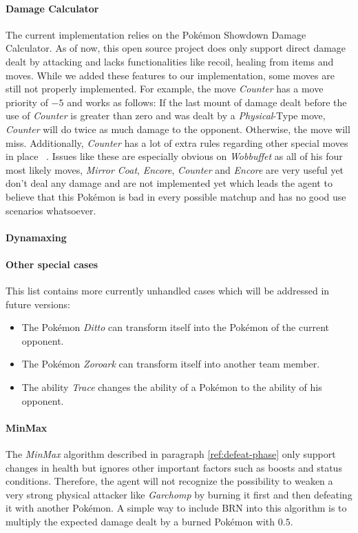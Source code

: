 \paragraph{Damage Calculator}
The current implementation relies on the Pokémon Showdown Damage Calculator. As of now, this open source project does 
only support direct damage dealt by attacking and lacks functionalities like recoil, healing from items and moves. While
we added these features to our implementation, some moves are still not properly implemented. For example, the move
\textit{Counter} has a move priority  of $-5$ and works as follows:
If the last mount of damage dealt before the use of \textit{Counter} is greater than zero and was dealt by a 
\textit{Physical}-Type move, \textit{Counter} will do twice as much damage to the opponent. Otherwise, the move
will miss. Additionally, \textit{Counter} has a lot of extra rules regarding other special moves in place 
~\autocite{Bulbapedia:Counter}. Issues like these are especially obvious on \textit{Wobbuffet} as all of his four
most likely moves, \textit{Mirror Coat}, \textit{Encore}, \textit{Counter} and \textit{Encore} are very useful
yet don't deal any damage and are not implemented yet which leads the agent to believe that this Pokémon is bad 
in every possible matchup and has no good use scenarios whatsoever.

\paragraph{Dynamaxing}

\paragraph{Other special cases}
This list contains more currently unhandled cases which will be addressed in future versions:
\begin{itemize}
  \item The Pokémon \textit{Ditto} can transform itself into the Pokémon of the current opponent.
  \item The Pokémon \textit{Zoroark} can transform itself into another team member. 
  \item The ability \textit{Trace} changes the ability of a Pokémon to the ability of his opponent.
\end{itemize}

\paragraph{MinMax}
The \textit{MinMax} algorithm described in paragraph \ref{ref:defeat-phase} only support changes in health
but ignores other important factors such as boosts and status conditions. Therefore, the agent will 
not recognize the possibility to weaken a very strong physical attacker like \textit{Garchomp} by burning
it first and then defeating it with another Pokémon. A simple way to include \ac{BRN} into this algorithm
is to multiply the expected damage dealt by a burned Pokémon with $0.5$. 

